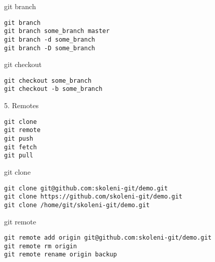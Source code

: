 \documentclass{beamer}
\begin{document}
\begin{frame}[fragile]

    {\LARGE git branch}\\

    \begin{verbatim}
git branch
git branch some_branch master
git branch -d some_branch
git branch -D some_branch
    \end{verbatim}

\end{frame}

\begin{frame}[fragile]

    {\LARGE git checkout}\\

    \begin{verbatim}
git checkout some_branch
git checkout -b some_branch
    \end{verbatim}

\end{frame}

\begin{frame}[fragile]

    {\LARGE 5. Remotes}\\

    \begin{verbatim}
git clone
git remote
git push
git fetch
git pull
    \end{verbatim}

\end{frame}

\begin{frame}[fragile]

    {\LARGE git clone}\\

    \begin{verbatim}
git clone git@github.com:skoleni-git/demo.git
git clone https://github.com/skoleni-git/demo.git
git clone /home/git/skoleni-git/demo.git
    \end{verbatim}

\end{frame}

\begin{frame}[fragile]

    {\LARGE git remote}\\

    \begin{verbatim}
git remote add origin git@github.com:skoleni-git/demo.git
git remote rm origin
git remote rename origin backup
    \end{verbatim}

\end{frame}
\end{document}
